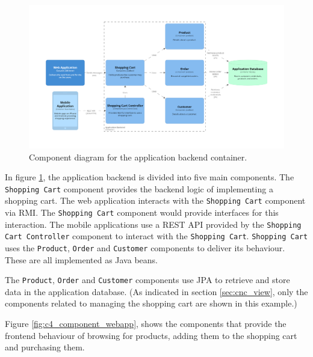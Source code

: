 \begin{figure}[h!]
    \centering
    \begin{adjustwidth}{-8.5mm}{-8.5mm}
        \includegraphics[trim=190 185 197 198,clip,width=0.96\paperwidth]{images/c4/appbackend_component_diagram.png}
    \end{adjustwidth}
    \caption{Component diagram for the application backend container.}
    \label{fig:c4_component_appbackend}
\end{figure}

In figure \ref{fig:c4_component_appbackend}, the application backend is divided into five main components.
The \texttt{Shopping Cart} component provides the backend logic of implementing a shopping cart.
The web application interacts with the \texttt{Shopping Cart} component via RMI.
The \texttt{Shopping Cart} component would provide interfaces for this interaction.
The mobile applications use a REST API provided by the \texttt{Shopping Cart Controller} component to interact with the \texttt{Shopping Cart}.
\texttt{Shopping Cart} uses the \texttt{Product}, \texttt{Order} and \texttt{Customer} components to deliver its behaviour.
These are all implemented as Java beans.

The \texttt{Product}, \texttt{Order} and \texttt{Customer} components use JPA to retrieve and store data in the application database.
(As indicated in section \ref{sec:cnc_view}, only the components related to managing the shopping cart are shown in this example.)

\pagebreak
\noindent
Figure \ref{fig:c4_component_webapp}, shows the components that provide the frontend behaviour
of browsing for products, adding them to the shopping cart and purchasing them.

